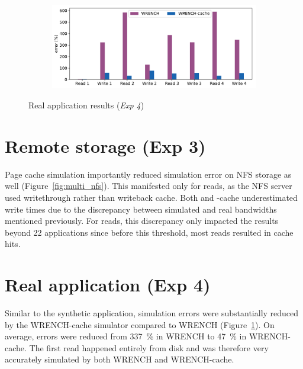\begin{figure}[b]
    \begin{subfigure}{0.95\linewidth}
        \centering
        \includegraphics[width=\linewidth]{result/nighres/figures/nighres_errors.pdf}
    \end{subfigure}
    \caption{Real application results (\textit{Exp 4})}
    \label{fig:nighres}
\end{figure}

\section{Remote storage (Exp 3)}

Page cache simulation importantly reduced simulation error
on NFS storage as well (Figure~\ref{fig:multi_nfs}). This
manifested only for reads, as the NFS server used writethrough rather than writeback cache.
Both \wrench and \wrench-cache
underestimated write times due to the discrepancy between
simulated and real bandwidths mentioned previously. For reads,
this discrepancy only impacted the results beyond 22
applications since before this threshold, most reads resulted in cache
hits.


\section{Real application (Exp 4)}
Similar to the synthetic application, simulation errors were
substantially reduced by the WRENCH-cache simulator compared to
WRENCH (Figure~\ref{fig:nighres}). On average, errors were reduced
from 337~\% in WRENCH to 47~\% in WRENCH-cache. 
The first read happened entirely from disk and was therefore 
very accurately simulated by both WRENCH and WRENCH-cache.

